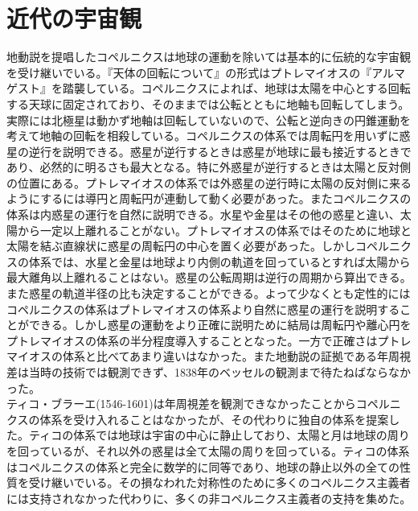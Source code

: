 \section{近代の宇宙観}
	地動説を提唱したコペルニクスは地球の運動を除いては基本的に伝統的な宇宙観を受け継いでいる。『天体の回転について』の形式はプトレマイオスの『アルマゲスト』を踏襲している。コペルニクスによれば、地球は太陽を中心とする回転する天球に固定されており、そのままでは公転とともに地軸も回転してしまう。実際には北極星は動かず地軸は回転していないので、公転と逆向きの円錐運動を考えて地軸の回転を相殺している。コペルニクスの体系では周転円を用いずに惑星の逆行を説明できる。惑星が逆行するときは惑星が地球に最も接近するときであり、必然的に明るさも最大となる。特に外惑星が逆行するときは太陽と反対側の位置にある。プトレマイオスの体系では外惑星の逆行時に太陽の反対側に来るようにするには導円と周転円が連動して動く必要があった。またコペルニクスの体系は内惑星の運行を自然に説明できる。水星や金星はその他の惑星と違い、太陽から一定以上離れることがない。プトレマイオスの体系ではそのために地球と太陽を結ぶ直線状に惑星の周転円の中心を置く必要があった。しかしコペルニクスの体系では、水星と金星は地球より内側の軌道を回っているとすれば太陽から最大離角以上離れることはない。惑星の公転周期は逆行の周期から算出できる。また惑星の軌道半径の比も決定することができる。よって少なくとも定性的にはコペルニクスの体系はプトレマイオスの体系より自然に惑星の運行を説明することができる。しかし惑星の運動をより正確に説明ために結局は周転円や離心円をプトレマイオスの体系の半分程度導入することとなった。一方で正確さはプトレマイオスの体系と比べてあまり違いはなかった。また地動説の証拠である年周視差は当時の技術では観測できず、1838年のベッセルの観測まで待たねばならなかった。\\
	ティコ・ブラーエ(1546-1601)は年周視差を観測できなかったことからコペルニクスの体系を受け入れることはなかったが、その代わりに独自の体系を提案した。ティコの体系では地球は宇宙の中心に静止しており、太陽と月は地球の周りを回っているが、それ以外の惑星は全て太陽の周りを回っている。ティコの体系はコペルニクスの体系と完全に数学的に同等であり、地球の静止以外の全ての性質を受け継いでいる。その損なわれた対称性のために多くのコペルニクス主義者には支持されなかった代わりに、多くの非コペルニクス主義者の支持を集めた。
